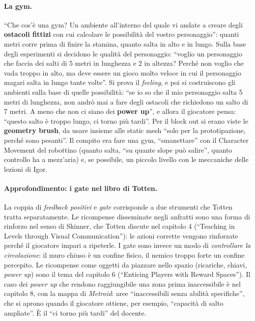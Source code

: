 \paragraph{La gym.} ``Che cos'è una gym? Un ambiente all'interno del quale vi andate a
creare degli \textbf{ostacoli fittizi} con cui calcolare le possibilità del vostro
personaggio'': quanti metri corre prima di finire la stamina, quanto salta in alto e in
lungo. Sulla base degli esperimenti si decidono le qualità del personaggio: ``voglio un
personaggio che faccia dei salti di 5 metri in lunghezza e 2 in altezza? Perché non voglio
che vada troppo in alto, ma deve essere un gioco molto veloce in cui il personaggio magari
salta in lungo tante volte''. Si prova il \emph{feeling}, e poi si costruiscono gli ambienti
sulla base di quelle possibilità: ``se io so che il mio personaggio salta 5 metri di
lunghezza, non andrò mai a fare degli ostacoli che richiedono un salto di 7 metri. A meno
che non ci siano dei \textbf{power up}'', e allora il giocatore pensa: ``questo salto è
troppo lungo, ci torno più tardi''. Per il block out si erano viste le \textbf{geometry
brush}, da usare insieme alle static mesh ``solo per la prototipazione, perché sono
pesanti''. Il compito era fare una gym, ``smanettare'' con il Character Movement del
robottino (quanto salta, ``su quante slope può salire'', quanto controllo ha a mezz'aria) e,
se possibile, un piccolo livello con le meccaniche delle lezioni di Igor.

\paragraph{Approfondimento: i gate nel libro di Totten.} La coppia di \emph{feedback
positivi} e \emph{gate} corrisponde a due strumenti che Totten tratta separatamente. Le
ricompense disseminate negli anfratti sono una forma di rinforzo nel senso di Skinner, che
Totten discute nel capitolo 4 (``Teaching in Levels through Visual Communication''): le
azioni corrette vengono rinforzate perché il giocatore impari a ripeterle. I gate sono
invece un modo di \emph{controllare la circolazione}: il muro chiuso è un confine fisico,
il nemico troppo forte un confine percepito. Le ricompense come oggetti da piazzare nello
spazio (ricariche, chiavi, \emph{power up}) sono il tema del capitolo 6 (``Enticing Players
with Reward Spaces''). Il caso dei \emph{power up} che rendono raggiungibile una zona prima
inaccessibile è nel capitolo 8, con la mappa di \emph{Metroid}: aree ``inaccessibili senza
abilità specifiche'', che si aprono quando il giocatore ottiene, per esempio, ``capacità di
salto ampliate''. È il ``ci torno più tardi'' del docente.

